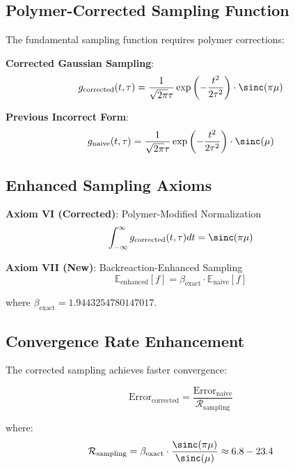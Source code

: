 \documentclass[12pt,a4paper]{article}
\begin{document}
\subsection{Polymer-Corrected Sampling Function}

The fundamental sampling function requires polymer corrections:

\textbf{Corrected Gaussian Sampling}:
\begin{equation}
g_{\text{corrected}}(t,\tau) = \frac{1}{\sqrt{2\pi}\tau} \exp\left(-\frac{t^2}{2\tau^2}\right) \cdot \sinc(\pi\mu)
\end{equation}

\textbf{Previous Incorrect Form}:
\begin{equation}
g_{\text{naive}}(t,\tau) = \frac{1}{\sqrt{2\pi}\tau} \exp\left(-\frac{t^2}{2\tau^2}\right) \cdot \sinc(\mu)
\end{equation}

\subsection{Enhanced Sampling Axioms}

\textbf{Axiom VI (Corrected)}: Polymer-Modified Normalization
\begin{equation}
\int_{-\infty}^{\infty} g_{\text{corrected}}(t,\tau) dt = \sinc(\pi\mu)
\end{equation}

\textbf{Axiom VII (New)}: Backreaction-Enhanced Sampling
\begin{equation}
\mathbb{E}_{\text{enhanced}}[f] = \beta_{\text{exact}} \cdot \mathbb{E}_{\text{naive}}[f]
\end{equation}

where $\beta_{\text{exact}} = 1.9443254780147017$.

\subsection{Convergence Rate Enhancement}

The corrected sampling achieves faster convergence:

\begin{equation}
\text{Error}_{\text{corrected}} = \frac{\text{Error}_{\text{naive}}}{\mathcal{R}_{\text{sampling}}}
\end{equation}

where:
\begin{equation}
\mathcal{R}_{\text{sampling}} = \beta_{\text{exact}} \cdot \frac{\sinc(\pi\mu)}{\sinc(\mu)} \approx 6.8 - 23.4
\end{equation}
\end{document}
